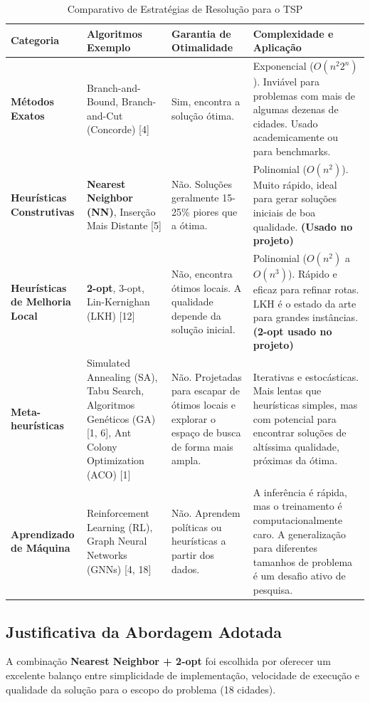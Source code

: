 \documentclass[11pt,a4paper,twocolumn]{article}
\begin{document}
\begin{table}[ht]
\centering
\caption{Comparativo de Estratégias de Resolução para o TSP}
\label{tab:comparativo_algoritmos}
\begin{tabular}{p{2.5cm} p{4.5cm} p{3.5cm} p{4.5cm}}
\toprule
\textbf{Categoria} & \textbf{Algoritmos Exemplo} & \textbf{Garantia de Otimalidade} & \textbf{Complexidade e Aplicação} \\
\midrule
\textbf{Métodos Exatos} & Branch-and-Bound, Branch-and-Cut (Concorde) [4] & Sim, encontra a solução ótima. & Exponencial ($O(n^2 2^n)$). Inviável para problemas com mais de algumas dezenas de cidades. Usado academicamente ou para benchmarks. \\
\midrule
\textbf{Heurísticas Construtivas} & \textbf{Nearest Neighbor (NN)}, Inserção Mais Distante [5] & Não. Soluções geralmente 15-25\% piores que a ótima. & Polinomial ($O(n^2)$). Muito rápido, ideal para gerar soluções iniciais de boa qualidade. \textbf{(Usado no projeto)} \\
\midrule
\textbf{Heurísticas de Melhoria Local} & \textbf{2-opt}, 3-opt, Lin-Kernighan (LKH) [12] & Não, encontra ótimos locais. A qualidade depende da solução inicial. & Polinomial ($O(n^2)$ a $O(n^3)$). Rápido e eficaz para refinar rotas. LKH é o estado da arte para grandes instâncias. \textbf{(2-opt usado no projeto)} \\
\midrule
\textbf{Meta-heurísticas} & Simulated Annealing (SA), Tabu Search, Algoritmos Genéticos (GA) [1, 6], Ant Colony Optimization (ACO) [1] & Não. Projetadas para escapar de ótimos locais e explorar o espaço de busca de forma mais ampla. & Iterativas e estocásticas. Mais lentas que heurísticas simples, mas com potencial para encontrar soluções de altíssima qualidade, próximas da ótima. \\
\midrule
\textbf{Aprendizado de Máquina} & Reinforcement Learning (RL), Graph Neural Networks (GNNs) [4, 18] & Não. Aprendem políticas ou heurísticas a partir dos dados. & A inferência é rápida, mas o treinamento é computacionalmente caro. A generalização para diferentes tamanhos de problema é um desafio ativo de pesquisa. \\
\bottomrule
\end{tabular}
\end{table}

\subsection{Justificativa da Abordagem Adotada}
A combinação \textbf{Nearest Neighbor + 2-opt} foi escolhida por oferecer um excelente balanço entre simplicidade de implementação, velocidade de execução e qualidade da solução para o escopo do problema (18 cidades).
\end{document}

